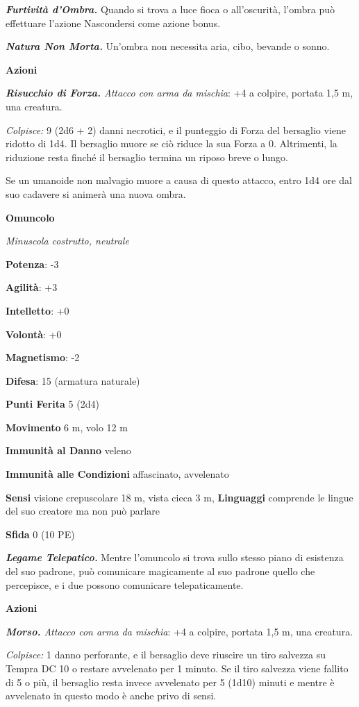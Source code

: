\begin{multicols}{2}
\emph{\textbf{Furtività d'Ombra.}} Quando si trova a luce fioca o
all'oscurità, l'ombra può effettuare l'azione Nascondersi come azione
bonus.

\emph{\textbf{Natura Non Morta.}} Un'ombra non necessita aria, cibo,
bevande o sonno.

\textbf{Azioni}

\emph{\textbf{Risucchio di Forza.} Attacco con arma da mischia}: +4 a
colpire, portata 1,5 m, una creatura.

\emph{Colpisce:} 9 (2d6 + 2) danni necrotici, e il punteggio di Forza
del bersaglio viene ridotto di 1d4. Il bersaglio muore se ciò riduce la
sua Forza a 0. Altrimenti, la riduzione resta finché il bersaglio
termina un riposo breve o lungo.

Se un umanoide non malvagio muore a causa di questo attacco, entro 1d4
ore dal suo cadavere si animerà una nuova ombra.

\textbf{Omuncolo}

\emph{Minuscola costrutto, neutrale}

\textbf{Potenza}: -3

\textbf{Agilità}: +3

\textbf{Intelletto}: +0

\textbf{Volontà}: +0

\textbf{Magnetismo}: -2

\textbf{Difesa}: 15 (armatura naturale)

\textbf{Punti Ferita} 5 (2d4)

\textbf{Movimento} 6 m, volo 12 m

\textbf{Immunità al Danno} veleno

\textbf{Immunità alle Condizioni} affascinato, avvelenato

\textbf{Sensi} visione crepuscolare 18 m, vista cieca 3 m, 
\textbf{Linguaggi} comprende le lingue del suo creatore ma non può
parlare

\textbf{Sfida} 0 (10 PE)

\emph{\textbf{Legame Telepatico.}} Mentre l'omuncolo si trova sullo
stesso piano di esistenza del suo padrone, può comunicare magicamente al
suo padrone quello che percepisce, e i due possono comunicare
telepaticamente.

\textbf{Azioni}

\emph{\textbf{Morso.} Attacco con arma da mischia}: +4 a colpire,
portata 1,5 m, una creatura.

\emph{Colpisce:} 1 danno perforante, e il bersaglio deve riuscire un
tiro salvezza su Tempra DC 10 o restare avvelenato per 1 minuto.
Se il tiro salvezza viene fallito di 5 o più, il bersaglio resta invece
avvelenato per 5 (1d10) minuti e mentre è avvelenato in questo modo è
anche privo di sensi.




\end{multicols}
